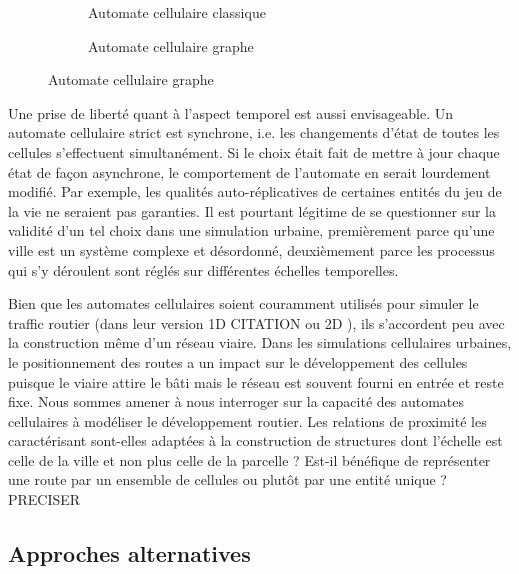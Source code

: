 \documentclass[12pt]{article}
\begin{document}
\begin{figure}
  \begin{subfigure}[b]{.5\linewidth}
    \centering
    
    \caption{Automate cellulaire classique}
  \end{subfigure}
  \begin{subfigure}[b]{.5\linewidth}
    \centering
    
    \caption{Automate cellulaire graphe}
  \end{subfigure}
\end{figure}

Une prise de liberté quant à l'aspect temporel est aussi
envisageable. Un automate cellulaire strict est synchrone, i.e. les
changements d'état de toutes les cellules s'effectuent
simultanément. Si le choix était fait de mettre à jour chaque état de
façon asynchrone, le comportement de l'automate en serait lourdement
modifié. Par exemple, les qualités auto-réplicatives de certaines
entités du jeu de la vie ne seraient pas garanties. Il est pourtant
légitime de se questionner sur la validité d'un tel choix dans une
simulation urbaine, premièrement parce qu'une ville est un système
complexe et désordonné, deuxièmement parce les processus qui s'y
déroulent sont réglés sur différentes échelles temporelles.

Bien que les automates cellulaires soient couramment utilisés pour
simuler le traffic routier (dans leur version 1D CITATION ou 2D
\cite{Queloz1996}), ils s'accordent peu avec la construction même d'un
réseau viaire. Dans les simulations cellulaires urbaines, le
positionnement des routes a un impact sur le développement des
cellules puisque le viaire attire le bâti mais le réseau est souvent
fourni en entrée et reste fixe. Nous sommes amener à nous interroger
sur la capacité des automates cellulaires à modéliser le développement
routier. Les relations de proximité les caractérisant sont-elles
adaptées à la construction de structures dont l'échelle est celle de
la ville et non plus celle de la parcelle ? Est-il bénéfique de
représenter une route par un ensemble de cellules ou plutôt par une
entité unique ? PRECISER

\subsection{Approches alternatives}
\end{document}
